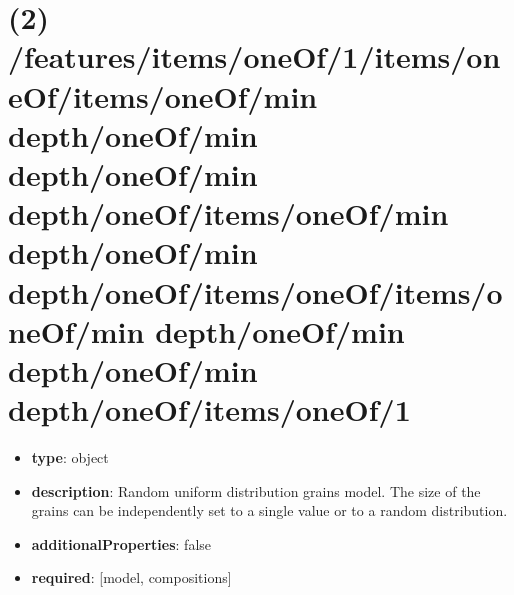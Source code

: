 \section{(2) /features/items/oneOf/1/items/oneOf/items/oneOf/min depth/oneOf/min depth/oneOf/min depth/oneOf/items/oneOf/min depth/oneOf/min depth/oneOf/items/oneOf/items/oneOf/min depth/oneOf/min depth/oneOf/min depth/oneOf/items/oneOf/1}
\begin{itemize}[leftmargin=2em]\item {\bf type}: object
\item {\bf description}: Random uniform distribution grains model. The size of the grains can be independently set to a single value or to a random distribution.
\item {\bf additionalProperties}: false
\item {\bf required}: [model, compositions]\end{itemize}
